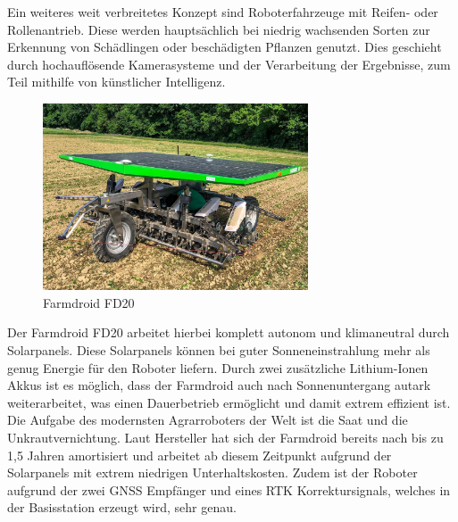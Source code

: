 Ein weiteres weit verbreitetes Konzept sind Roboterfahrzeuge mit Reifen- oder
Rollenantrieb. Diese werden hauptsächlich bei niedrig wachsenden Sorten zur
Erkennung von Schädlingen oder beschädigten Pflanzen genutzt. Dies geschieht
durch hochauflösende Kamerasysteme und der Verarbeitung der Ergebnisse, zum
Teil mithilfe von künstlicher Intelligenz.

\begin{figure}[h]
	\centering
	\includegraphics[width=0.7\textwidth]{bilder/farmdroid_fd20.png}
	\caption[Farmdroid FD20]{Farmdroid FD20}
	\label{fig:farmdroid_fd20}
\end{figure}

Der Farmdroid FD20 arbeitet hierbei komplett autonom und klimaneutral durch
Solarpanels. Diese Solarpanels können bei guter Sonneneinstrahlung mehr als
genug Energie für den Roboter liefern. Durch zwei zusätzliche Lithium-Ionen
Akkus ist es möglich, dass der Farmdroid auch nach Sonnenuntergang autark
weiterarbeitet, was einen Dauerbetrieb ermöglicht und damit extrem effizient
ist.\cite{jungwirth2022arbeitszeitbedarf}\\ Die Aufgabe des modernsten
Agrarroboters der Welt\cite{donaukurier2022} ist die Saat und die
Unkrautvernichtung. Laut Hersteller hat sich der Farmdroid bereits nach bis zu
1,5 Jahren amortisiert und arbeitet ab diesem Zeitpunkt aufgrund der
Solarpanels mit extrem niedrigen Unterhaltskosten. Zudem ist der Roboter
aufgrund der zwei GNSS Empfänger und eines RTK Korrektursignals, welches in der
Basisstation erzeugt wird, sehr genau.\cite{jungwirth2022arbeitszeitbedarf}\cite{spykman2023wirtschaftlichkeitsbewertung}